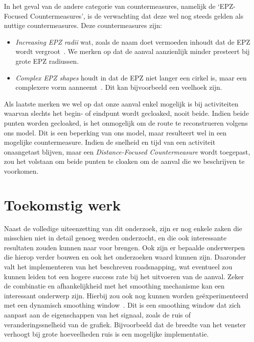 In het geval van de andere categorie van countermeasures, namelijk de
`EPZ-Focused Countermeasures', is de verwachting dat deze wel nog steeds gelden
als nuttige countermeasures. Deze countermeasures zijn:
\begin{itemize}
      \item \textit{Increasing \ac{EPZ} radii} wat, zoals de naam doet vermoeden inhoudt dat de \ac{EPZ} wordt vergroot~\cite{Dhondt}. We merken op dat de aanval
            aanzienlijk minder presteert bij grote \ac{EPZ} radiussen.
      \item \textit{Complex \ac{EPZ} shapes} houdt in dat de \ac{EPZ} niet langer een cirkel is, maar een
            complexere vorm aanneemt~\cite{Dhondt}. Dit kan bijvoorbeeld een veelhoek zijn.
\end{itemize}

Als laatste merken we wel op dat onze aanval enkel mogelijk is bij activiteiten
waarvan slechts het begin- of eindpunt wordt gecloaked, nooit beide. Indien
beide punten worden gecloaked, is het onmogelijk om de route te reconstrueren
volgens ons model. Dit is een beperking van ons model, maar resulteert wel in
een mogelijke countermeasure. Indien de snelheid en tijd van een activiteit
onaangetast blijven, maar een \textit{Distance-Focused Countermeasure} wordt
toegepast, zou het volstaan om beide punten te cloaken om de aanval die we
beschrijven te voorkomen.

\section{Toekomstig werk}
Naast de volledige uiteenzetting van dit onderzoek, zijn er nog enkele zaken
die misschien niet in detail genoeg werden onderzocht, en die ook interessante
resultaten zouden kunnen naar voor brengen. Ook zijn er bepaalde onderwerpen
die hierop verder bouwen en ook het onderzoeken waard kunnen zijn. Daaronder
valt het implementeren van het beschreven roadsnapping, wat eventueel zou
kunnen leiden tot een hogere success rate bij het uitvoeren van de aanval.
Zeker de combinatie en afhankelijkheid met het smoothing mechanisme kan een
interessant onderwerp zijn. Hierbij zou ook nog kunnen worden geëxperimenteerd
met een dynamisch smoothing window~\cite{shmoothing}. Dit is een smoothing
window dat zich aanpast aan de eigenschappen van het signaal, zoals de ruis of
veranderingssnelheid van de grafiek. Bijvoorbeeld dat de breedte van het
venster verhoogt bij grote hoeveelheden ruis is een mogelijke implementatie.

